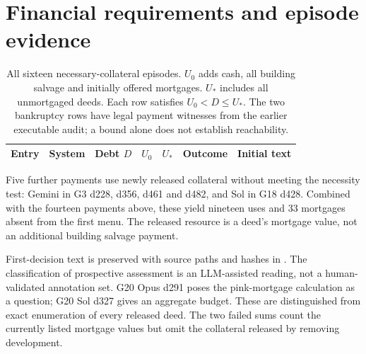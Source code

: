 \section{Financial requirements and episode evidence}
\label{app:finance}
\begin{longtable}{@{}llrrrll@{}}
\caption{All sixteen necessary-collateral episodes. $U_0$ adds cash, all building salvage and initially offered mortgages. $U_*$ includes all unmortgaged deeds. Each row satisfies $U_0<D\leq U_*$. The two bankruptcy rows have legal payment witnesses from the earlier executable audit; a bound alone does not establish reachability.}\label{tab:necessary}\\
\toprule Entry & System & Debt $D$ & $U_0$ & $U_*$ & Outcome & Initial text\\\midrule\endhead

\end{longtable}

Five further payments use newly released collateral without meeting the necessity test: Gemini in G3 d228, d356, d461 and d482, and Sol in G18 d428. Combined with the fourteen payments above, these yield nineteen uses and 33 mortgages absent from the first menu. The released resource is a deed's mortgage value, not an additional building salvage payment.

First-decision text is preserved with source paths and hashes in . The classification of prospective assessment is an LLM-assisted reading, not a human-validated annotation set. G20 Opus d291 poses the pink-mortgage calculation as a question; G20 Sol d327 gives an aggregate budget. These are distinguished from exact enumeration of every released deed. The two failed sums count the currently listed mortgage values but omit the collateral released by removing development.

